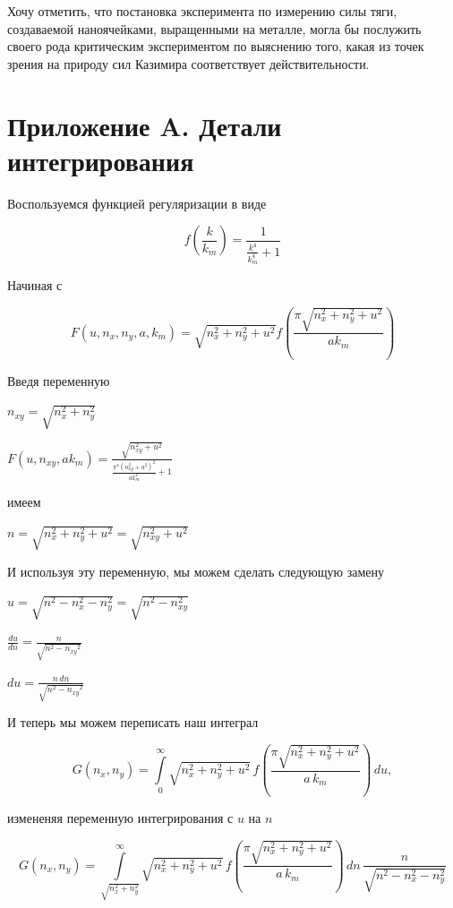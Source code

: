 \documentclass[11pt]{article}
\begin{document}
Хочу отметить, что постановка эксперимента по измерению силы тяги,
создаваемой наноячейками, выращенными на металле, могла бы послужить
своего рода критическим экспериментом по выяснению того, какая из точек
зрения на природу сил Казимира соответствует действительности.

    \section{Приложение A. Детали
интегрирования}\label{ux43fux440ux438ux43bux43eux436ux435ux43dux438ux435-a.-ux434ux435ux442ux430ux43bux438-ux438ux43dux442ux435ux433ux440ux438ux440ux43eux432ux430ux43dux438ux44f}

    Воспользуемся функцией регуляризации в виде

    \[f\left(\frac{k}{k_m}\right) = \frac{1}{\frac{k^{4}}{k_{m}^{4}} + 1}\]

    Начиная с

    \[F\left(u, n_x, n_y, a, k_m\right) = \sqrt{n_{x}^{2} + n_{y}^{2} + u^{2}} f\left(\frac{\pi \sqrt{n_{x}^{2} + n_{y}^{2} + u^{2}}}{a k_{m}}\right)\]

    Введя переменную

\(n_{xy} = \sqrt{n_x^2 + n_y^2}\)

    \(F\left(u, n_{xy}, ak_m\right) = \frac{\sqrt{n_{\mathit{xy}}^{2} + u^{2}}}{\frac{\pi^{4} {\left(n_{\mathit{xy}}^{2} + u^{2}\right)}^{2}}{\mathit{ak}_{m}^{4}} + 1}\)

    имеем

\(n = \sqrt{n_x^2 + n_y^2 + u^2} = \sqrt{n_{xy}^2 + u^2}\)

И используя эту переменную, мы можем сделать следующую замену

\(u = \sqrt{n^2 - n_x^2 - n_y^2} = \sqrt{n^2 - n_{xy}^2}\)

\(\frac{du}{dn} = \frac{n}{\sqrt{n^{2} - \mathit{n_{xy}}^{2}}}\)

\(d{u}= \frac{n\,d{n}}{\sqrt{n^{2} - \mathit{n_{xy}}^{2}}}\)

    И теперь мы можем переписать наш интеграл

    \[G\left(n_x, n_y\right) = \int\limits_{0}^{\infty}\sqrt{n_x^2 + n_y^2+u^2}\,
f\left(\frac{\pi\sqrt{n_x^2 + n_y^2+u^2}}{a\,k_m}\right)\,d{u}, 
\]

измененяя переменную интегрирования с \(u\) на \(n\)

    \[
G\left(n_x, n_y\right) = \int\limits_{\sqrt{n_x^2 + n_y^2}}^{\infty}\sqrt{n_x^2 + n_y^2+u^2}\,
f\left(\frac{\pi\sqrt{n_x^2 + n_y^2+u^2}}{a\,k_m}\right)\,dn\,{\frac{n}{\sqrt{n^{2} - n_{x}^{2} - n_{y}^{2}}}}
\]
\end{document}
